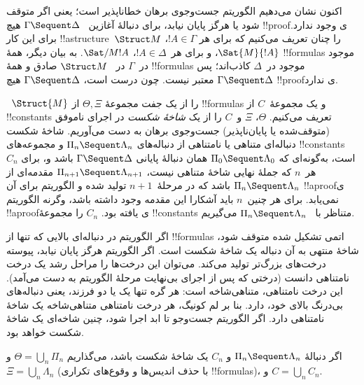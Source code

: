 \documentclass[../../../include/open-logic-section]{subfiles}
\begin{document}


اکنون نشان می‌دهیم الگوریتم جست‌وجوی برهان خطاناپذیر است؛ یعنی اگر
متوقف شود یا هرگز پایان نیابد، برای دنبالهٔ آغازین
~$\Gamma \Sequent \Delta$ هیچ !!{proof}ی وجود ندارد. برای این کار
!!a{structure}~$\Struct M$ را چنان تعریف می‌کنیم که برای هر
$!A \in \Gamma$، $\Sat{M}{!A}$، و برای هر~$!A \in \Delta$،
$\Sat/{M}{!A}$. به بیان دیگر، همهٔ !!{formula}s موجود در~$\Gamma$ در
~$\Struct M$ صادق و همهٔ !!{formula}s موجود در~$\Delta$ کاذب‌اند؛ پس
$\Gamma \Sequent \Delta$ معتبر نیست. چون  درست است،
$\Gamma \Sequent \Delta$ هیچ !!{proof}ی ندارد.

~‌$\Struct{M}$ را از یک جفت مجموعهٔ $\Theta, \Xi$ از !!{formula}s و
یک مجموعهٔ~$C$ از !!{constant}s تعریف می‌کنیم. $\Theta$، $\Xi$ و~$C$
را از یک \emph{شاخهٔ شکست} در اجرای ناموفق (متوقف‌شده یا پایان‌ناپذیر)
جست‌وجوی برهان به دست می‌آوریم. شاخهٔ شکست دنباله‌ای متناهی یا
نامتناهی از دنباله‌های $\Pi_n \Sequent \Lambda_n$ و مجموعه‌های
!!{constant}s~$C_n$ است، به‌گونه‌ای که $\Pi_0 \Sequent \Lambda_0$
همان دنبالهٔ پایانی $\Gamma \Sequent \Delta$ باشد و، برای هر~$n$ که
جملهٔ نهایی شاخهٔ متناهی نیست،
$\Pi_{n+1} \Sequent \Lambda_{n+1}$ مقدمه‌ای از
$\Pi_n \Sequent \Lambda_n$ باشد که در مرحلهٔ~$n+1$ تولید شده و
الگوریتم برای آن !!a{proof}ی نمی‌یابد. برای هر چنین~$n$ باید آشکارا
این مقدمه وجود داشته باشد، وگرنه الگوریتم !!a{proof}ی یافته بود.
$C_n$ را مجموعهٔ !!{constant}s متناظر با
~$\Pi_n \Sequent \Lambda_n$ می‌گیریم.

اگر الگوریتم در دنباله‌ای بالایی که تنها از !!{formula}s اتمی تشکیل
شده متوقف شود، شاخهٔ منتهی به آن دنباله یک شاخهٔ شکست است. اگر
الگوریتم هرگز پایان نیابد، پیوسته درخت‌های بزرگ‌تر تولید می‌کند. می‌توان
این درخت‌ها را مراحل رشد یک درخت نامتناهی دانست (درختی که پس از اجرای
بی‌نهایت مرحلهٔ الگوریتم به دست می‌آمد). این درخت نامتناهی، متناهی‌شاخه
است: هر گره تنها یک یا دو فرزند، یعنی دنباله‌های بی‌درنگ بالای خود،
دارد. بنا بر لم کونیگ، هر درخت نامتناهی متناهی‌شاخه یک شاخهٔ نامتناهی
دارد. اگر الگوریتم جست‌وجو تا ابد اجرا شود، چنین شاخه‌ای یک شاخهٔ شکست
خواهد بود.

اگر دنبالهٔ $\Pi_n \Sequent \Lambda_n$ و $C_n$ یک شاخهٔ شکست باشد،
می‌گذاریم $\Theta = \bigcup_n \Pi_n$ و
$\Xi = \bigcup_n \Lambda_n$ (با حذف اندیس‌ها و وقوع‌های تکراری
!!{formula}s)، و $C = \bigcup_n C_n$.
\end{document}
